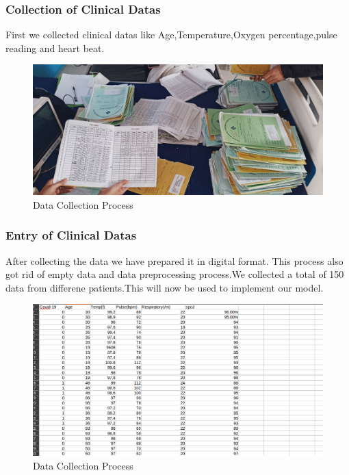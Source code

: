 \documentclass[a4paper,12pt]{report}
\begin{document}
  \subsubsection{Collection of Clinical Datas}
  First we collected clinical datas like Age,Temperature,Oxygen percentage,pulse reading and heart beat.
  \begin{figure}[h] %
   \begin{center}
   \includegraphics[scale=0.3]{collection.jpg}
   \caption{Data Collection Process}
  \end{center}
  \end{figure}

  \subsubsection{Entry of Clinical Datas}
  After collecting the data we have prepared it in digital format. This process also got rid of empty data and data preprocessing process.We collected a total of 150 data from differene patients.This will now be used to implement our model.
  \begin{figure}[h] %
   \begin{center}
   \includegraphics[scale=0.4]{excel.png}
   \caption{Data Collection Process}
  \end{center}
  \end{figure}
\end{document}
